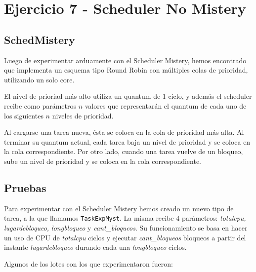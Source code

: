 \section{Ejercicio 7 - Scheduler No Mistery}

\subsection{SchedMistery} 

Luego de experimentar arduamente con el Scheduler Mistery, hemos encontrado que implementa un esquema tipo Round Robin con múltiples colas de prioridad, utilizando un solo core.

El nivel de prioriad más alto utiliza un quantum de 1 ciclo, y además el scheduler recibe como parámetros $n$ valores que representarán el quantum de cada uno de los siguientes $n$ niveles de prioridad.

Al cargarse una tarea nueva, ésta se coloca en la cola de prioridad más alta.  Al terminar su quantum actual, cada tarea baja un nivel de prioridad y se coloca en la cola correspondiente.  Por otro lado, cuando una tarea vuelve de un bloqueo, sube un nivel de prioridad y se coloca en la cola correspondiente.

\subsection{Pruebas}

Para experimentar con el Scheduler Mistery hemos creado un nuevo tipo de tarea, a la que llamamos {\tt TaskExpMyst}. La misma recibe 4 parámetros: {\it totalcpu, lugardebloqueo, longbloqueo} y {\it cant_bloqueos}. Su funcionamiento se basa en hacer un uso de CPU de {\it totalcpu} ciclos y ejecutar {\it cant_bloqueos} bloqueos a partir del instante {\it lugardebloqueo} durando cada una {\it longbloqueo} ciclos.

Algunos de los lotes con los que experimentaron fueron:

